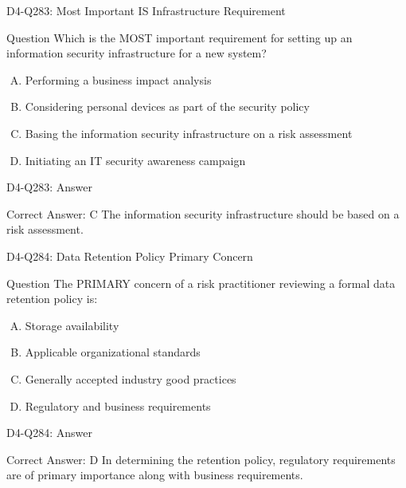 \documentclass{beamer}
\begin{document}
	\begin{frame}{D4-Q283: Most Important IS Infrastructure Requirement}
		\begin{block}{Question}
			Which is the MOST important requirement for setting up an information security infrastructure for a new system?
		\end{block}
		\begin{enumerate}[(A)]
			\item Performing a business impact analysis
			\item Considering personal devices as part of the security policy
			\item Basing the information security infrastructure on a risk assessment
			\item Initiating an IT security awareness campaign
		\end{enumerate}
	\end{frame}
	\begin{frame}{D4-Q283: Answer}
		\begin{block}{Correct Answer: C}
			The information security infrastructure should be based on a risk assessment.
		\end{block}
	\end{frame}
	
	\begin{frame}{D4-Q284: Data Retention Policy Primary Concern}
		\begin{block}{Question}
			The PRIMARY concern of a risk practitioner reviewing a formal data retention policy is:
		\end{block}
		\begin{enumerate}[(A)]
			\item Storage availability
			\item Applicable organizational standards
			\item Generally accepted industry good practices
			\item Regulatory and business requirements
		\end{enumerate}
	\end{frame}
	\begin{frame}{D4-Q284: Answer}
		\begin{block}{Correct Answer: D}
			In determining the retention policy, regulatory requirements are of primary importance along with business requirements.
		\end{block}
	\end{frame}
	
\end{document}
